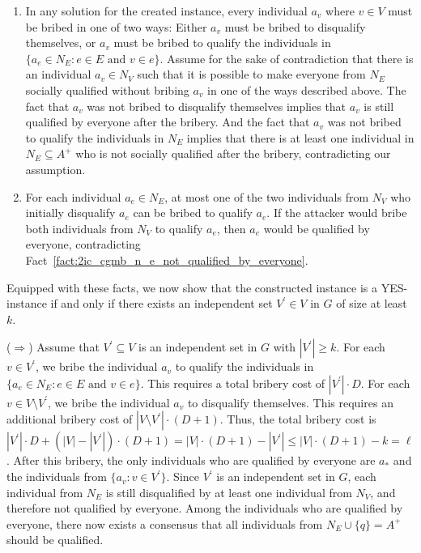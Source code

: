 \documentclass[
    12pt,               %
    a4paper,            %
    bibtotoc,           %
    pointlessnumbers,   %
    ngerman,            %
    titlepage,          %
    leqno,              %
    ]{scrarticle}       %
\newcommand\factref{Fact~\ref}
\begin{document}
\begin{Proof}
\begin{enumerate}[
    topsep=-4pt,
    leftmargin=*,
    itemindent=4.96em,
    label={\textit{Fact \ref*{thm:2ic_cgmb_npc}.\arabic*}:},
    ref={\ref*{thm:2ic_cgmb_npc}.\arabic*}
]
\item \label{fact:2ic_cgmb_all_from_n_v_are_bribed}
In any solution for the created instance, every individual $a_v$ where $v \in V$ must be bribed in one of two ways: Either $a_v$ must be bribed to disqualify themselves, or $a_v$ must be bribed to qualify the individuals in $\{ a_e \in N_E : e \in E \text{ and } v \in e \}$. Assume for the sake of contradiction that there is an individual $a_v \in N_V$ such that it is possible to make everyone from $N_E$ socially qualified without bribing $a_v$ in one of the ways described above. The fact that $a_v$ was not bribed to disqualify themselves implies that $a_v$ is still qualified by everyone after the bribery. And the fact that $a_v$ was not bribed to qualify the individuals in $N_E$ implies that there is at least one individual in $N_E \subseteq A^+$ who is not socially qualified after the bribery, contradicting our assumption.

\item \label{fact:2ic_cgmb_cannot_bribe_both_from_a_v}
For each individual $a_e \in N_E$, at most one of the two individuals from $N_V$ who initially disqualify $a_e$ can be bribed to qualify $a_e$. If the attacker would bribe both individuals from $N_V$ to qualify $a_e$, then $a_e$ would be qualified by everyone, contradicting \factref{fact:2ic_cgmb_n_e_not_qualified_by_everyone}.
\end{enumerate}



Equipped with these facts, we now show that the constructed instance is a YES-instance if and only if there exists an independent set $V^\prime \in V$ in $G$ of size at least $k$.

($\Rightarrow$) Assume that $V^\prime \subseteq V$ is an independent set in $G$ with $|V^\prime| \geq k$. For each $v \in V^\prime$, we bribe the individual $a_v$ to qualify the individuals in $\{ a_e \in N_E : e \in E \text{ and } v \in e \}$. This requires a total bribery cost of $|V^\prime| \cdot D$. For each $v \in V \setminus V^\prime$, we bribe the individual $a_v$ to disqualify themselves. This requires an additional bribery cost of $|V \setminus V^\prime| \cdot (D + 1)$. Thus, the total bribery cost is $|V^\prime| \cdot D + (|V| - |V^\prime|) \cdot (D + 1) = |V| \cdot (D + 1) - |V^\prime| \leq |V| \cdot (D + 1) - k = \ell$. After this bribery, the only individuals who are qualified by everyone are $a_\ast$ and the individuals from $\{ a_v : v \in V^\prime \}$. Since $V^\prime$ is an independent set in $G$, each individual from $N_E$ is still disqualified by at least one individual from $N_V$, and therefore not qualified by everyone. Among the individuals who are qualified by everyone, there now exists a consensus that all individuals from $N_E \cup \{q\} = A^+$ should be qualified.


\end{Proof}
\end{document}
